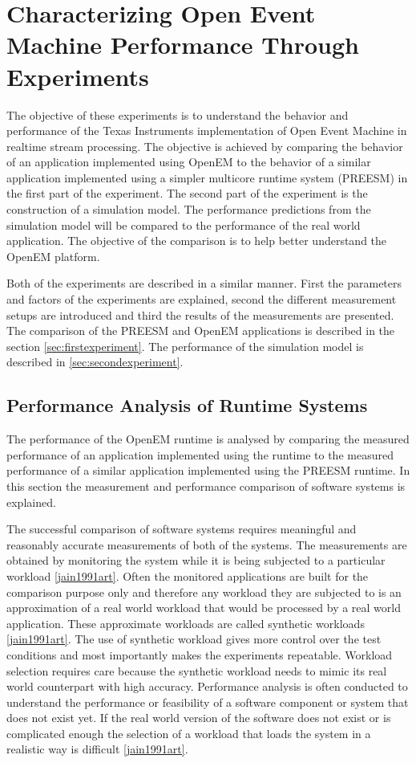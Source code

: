 \chapter [OpenEM Experiments] {Characterizing Open Event Machine Performance
Through Experiments}
\label{chapter:experiments}
The objective of these experiments is to understand the behavior and
performance of the Texas Instruments implementation of Open Event Machine in
realtime stream processing. The objective is achieved by comparing the behavior
of an application implemented using OpenEM to the behavior of a similar
application implemented using a simpler multicore runtime system (PREESM) in the
first part of the experiment. The second part of the experiment is the
construction of a simulation model. The performance predictions from the
simulation model will be compared to the performance of the real world
application. The objective of the comparison is to help better understand the
OpenEM platform.

Both of the experiments are described in a similar manner. First the parameters
and factors of the experiments are explained, second the different measurement
setups are introduced and third the results of the measurements are presented.
The comparison of the PREESM and OpenEM applications is described in the section
\ref{sec:firstexperiment}. The performance of the simulation model is described
in \ref{sec:secondexperiment}.

\section{Performance Analysis of Runtime Systems}
\label{sec:perfanalysis}
The performance of the OpenEM runtime is analysed by comparing the measured
performance of an application implemented using the runtime to the measured
performance of a similar application implemented using the PREESM runtime. In
this section the measurement and performance comparison of software systems is
explained.

The successful comparison of software systems requires meaningful and reasonably
accurate measurements of both of the systems. The measurements are obtained by
monitoring the system while it is being subjected to a particular workload
\ref{jain1991art}. Often the monitored applications are built for the comparison
purpose only and therefore any workload they are subjected to is an
approximation of a real world workload that would be processed by a real world
application. These approximate workloads are called synthetic workloads
\ref{jain1991art}. The use of synthetic workload gives more control over the
test conditions and most importantly makes the experiments repeatable. Workload
selection requires care because the synthetic workload needs to mimic its real
world counterpart with high accuracy. Performance analysis is often conducted to
understand the performance or feasibility of a software component or system that
does not exist yet. If the real world version of the software does not exist or
is complicated enough the selection of a workload that loads the system in a
realistic way is difficult \ref{jain1991art}.

